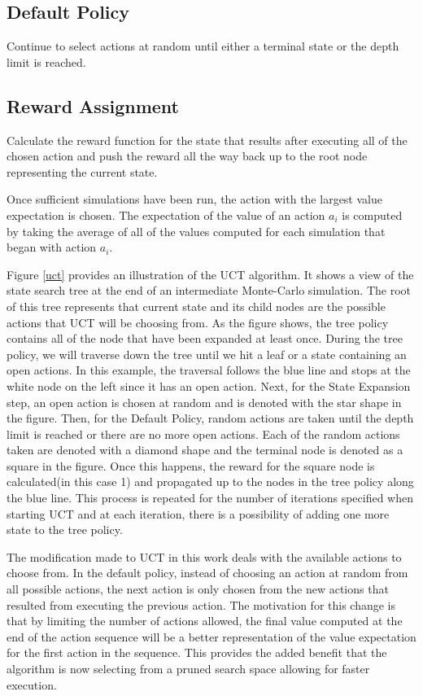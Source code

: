 \subsection{Default Policy}
Continue to select actions at random until either a terminal state or the depth limit is reached.

\subsection{Reward Assignment}
Calculate the reward function for the state that results after executing all of the chosen action and push the reward all
the way back up to the root node representing the current state.

Once sufficient simulations have been run, the action with the largest value expectation is chosen.  The expectation of the
value of an action $a_i$ is computed by taking the average of all of the values computed for each simulation that began with action $a_i$.

Figure \ref{uct} provides an illustration of the UCT algorithm.  It shows a view of the state search tree at the end of an
intermediate Monte-Carlo simulation.  The root of this tree represents that current state and its child nodes are the possible
actions that UCT will be choosing from.  As the figure shows, the tree policy contains all of the node that have been expanded
at least once.  During the tree policy, we will traverse down the tree until we hit a leaf or a state containing an open actions.
In this example, the traversal follows the blue line and stops at the white node on the left since it has an open action.  Next, for
the State Expansion step, an open action is chosen at random and is denoted with the star shape in the figure.  Then, for the
Default Policy, random actions are taken until the depth limit is reached or there are no more open actions.  Each of the random
actions taken are denoted with a diamond shape and the terminal node is denoted as a square in the figure.  Once this happens,
the reward for the square node is calculated(in this case 1) and propagated up to the nodes in the tree policy along the blue line.
This process is repeated for the number of iterations specified when starting UCT and at each iteration, there is a possibility of adding
one more state to the tree policy.

The modification made to UCT in this work deals with the available actions to choose from.  In the default policy, instead of choosing
an action at random from all possible actions, the next action is only chosen from the new actions that resulted from executing the
previous action.  The motivation for this change is that by limiting the number of actions allowed, the final value computed at the end
of the action sequence will be a better representation of the value expectation for the first action in the sequence.  This provides the
added benefit that the algorithm is now selecting from a pruned search space allowing for faster execution.
